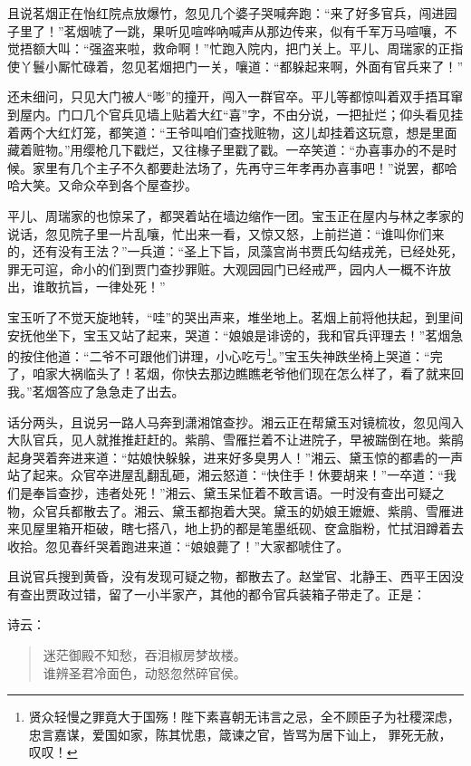\documentclass[12pt,oneside]{book}
\newenvironment{shici}{%
\begin{verse}%
\centering\large\hspace{12pt}}%
{\end{verse}}
\begin{document}
且说茗烟正在怡红院点放爆竹，忽见几个婆子哭喊奔跑：“来了好多官兵，闯进园子里了！”茗烟唬了一跳，果听见喧哗吶喊声从那边传来，似有千军万马喧嚷，不觉捂额大叫：“强盗来啦，救命啊！”忙跑入院内，把门关上。平儿、周瑞家的正指使丫鬟小厮忙碌着，忽见茗烟把门一关，嚷道：“都躲起来啊，外面有官兵来了！”

还未细问，只见大门被人“嘭”的撞开，闯入一群官卒。平儿等都惊叫着双手捂耳窜到屋内。门口几个官兵见墙上贴着大红“喜”字，不由分说，一把扯烂；仰头看见挂着两个大红灯笼，都笑道：“王爷叫咱们查找赃物，这儿却挂着这玩意，想是里面藏着赃物。”用缨枪几下戳烂，又往椽子里戳了戳。一卒笑道：“办喜事办的不是时候。家里有几个主子不久都要赴法场了，先再守三年孝再办喜事吧！”说罢，都哈哈大笑。又命众卒到各个屋查抄。

平儿、周瑞家的也惊呆了，都哭着站在墙边缩作一团。宝玉正在屋内与林之孝家的说话，忽见院子里一片乱嚷，忙出来一看，又惊又怒，上前拦道：“谁叫你们来的，还有没有王法？”一兵道：“圣上下旨，凤藻宫尚书贾氏勾结戎羌，已经处死，罪无可逭，命小的们到贾门查抄罪赃。大观园园门已经戒严，园内人一概不许放出，谁敢抗旨，一律处死！”

宝玉听了不觉天旋地转，“哇”的哭出声来，堆坐地上。茗烟上前将他扶起，到里间安抚他坐下，宝玉又站了起来，哭道：“娘娘是诽谤的，我和官兵评理去！”茗烟急的按住他道：“二爷不可跟他们讲理，小心吃亏\footnote{贤众轻慢之罪竟大于国殇！陛下素喜朝无讳言之忌，全不顾臣子为社稷深虑，忠言嘉谋，爱国如家，陈其忧患，箴谏之官，皆骂为居下讪上， 罪死无赦，叹叹！}。”宝玉失神跌坐椅上哭道：“完了，咱家大祸临头了！茗烟，你快去那边瞧瞧老爷他们现在怎么样了，看了就来回我。”茗烟答应了急急走了出去。

话分两头，且说另一路人马奔到潇湘馆查抄。湘云正在帮黛玉对镜梳妆，忽见闯入大队官兵，见人就推推赶赶的。紫鹃、雪雁拦着不让进院子，早被踹倒在地。紫鹃起身哭着奔进来道：“姑娘快躲躲，进来好多臭男人！”湘云、黛玉惊的都砉的一声站了起来。众官卒进屋乱翻乱砸，湘云怒道：“快住手！休要胡来！”一卒道：“我们是奉旨查抄，违者处死！”湘云、黛玉呆怔着不敢言语。一时没有查出可疑之物，众官兵都散去了。湘云、黛玉都抱着大哭。黛玉的奶娘王嬷嬷、紫鹃、雪雁进来见屋里箱开柜破，瞎七搭八，地上扔的都是笔墨纸砚、奁盒脂粉，忙拭泪蹲着去收拾。忽见春纤哭着跑进来道：“娘娘薨了！”大家都唬住了。

且说官兵搜到黄昏，没有发现可疑之物，都散去了。赵堂官、北静王、西平王因没有查出贾政过错，留了一小半家产，其他的都令官兵装箱子带走了。正是：

诗云：
\begin{shici}
迷茫御殿不知愁，吞泪椒房梦故楼。\\
谁辨圣君冷面色，动怒忽然碎官侯。
\end{shici}
\end{document}
